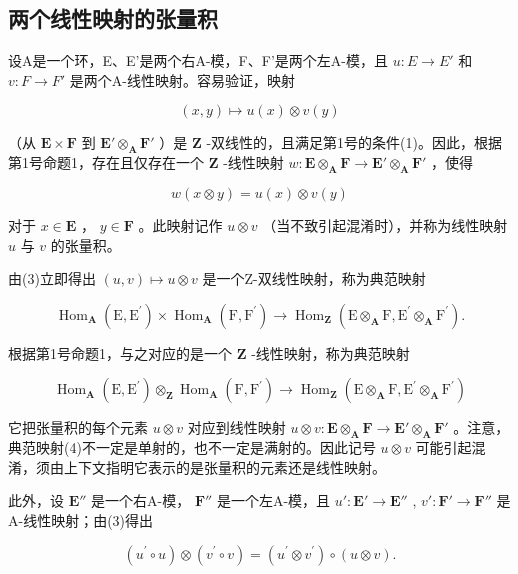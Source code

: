 \subsection{两个线性映射的张量积}

设A是一个环，E、E'是两个右A-模，F、F'是两个左A-模，且 \(u: E \rightarrow E'\) 和 \(v: F \rightarrow F'\) 是两个A-线性映射。容易验证，映射

\[
(x, y) \mapsto u (x) \otimes v (y)
\]

（从 \(\mathbf{E} \times \mathbf{F}\) 到 \(\mathbf{E}' \otimes_{\mathbf{A}} \mathbf{F}'\) ）是 \(\mathbf{Z}\) -双线性的，且满足第1号的条件(1)。因此，根据第1号命题1，存在且仅存在一个 \(\mathbf{Z}\) -线性映射 \(w: \mathbf{E} \otimes_{\mathbf{A}} \mathbf{F} \to \mathbf{E}' \otimes_{\mathbf{A}} \mathbf{F}'\) ，使得

\[
w (x \otimes y) = u (x) \otimes v (y)\tag{3}
\]

对于 \(x \in \mathbf{E}\) ， \(y \in \mathbf{F}\) 。此映射记作 \(u \otimes v\) （当不致引起混淆时），并称为线性映射 \(u\) 与 \(v\) 的张量积。

由(3)立即得出 \((u, v) \mapsto u \otimes v\) 是一个Z-双线性映射，称为典范映射

\[
\operatorname{Hom} _ {\mathbf {A}} (\mathrm{E}, \mathrm{E} ^ {\prime}) \times \operatorname{Hom} _ {\mathbf {A}} (\mathrm{F}, \mathrm{F} ^ {\prime}) \rightarrow \operatorname{Hom} _ {\mathbf {Z}} (\mathrm{E} \otimes_ {\mathbf {A}} \mathrm{F}, \mathrm{E} ^ {\prime} \otimes_ {\mathbf {A}} \mathrm{F} ^ {\prime}).
\]

根据第1号命题1，与之对应的是一个 \(\mathbf{Z}\) -线性映射，称为典范映射

\[
\operatorname{Hom} _ {\mathbf {A}} (\mathrm{E}, \mathrm{E} ^ {\prime}) \otimes_ {\mathbf {Z}} \operatorname{Hom} _ {\mathbf {A}} (\mathrm{F}, \mathrm{F} ^ {\prime}) \rightarrow \operatorname{Hom} _ {\mathbf {Z}} (\mathrm{E} \otimes_ {\mathbf {A}} \mathrm{F}, \mathrm{E} ^ {\prime} \otimes_ {\mathbf {A}} \mathrm{F} ^ {\prime})\tag{4}
\]

它把张量积的每个元素 \(u \otimes v\) 对应到线性映射 \(u \otimes v: \mathbf{E} \otimes_{\mathbf{A}} \mathbf{F} \to \mathbf{E}' \otimes_{\mathbf{A}} \mathbf{F}'\) 。注意，典范映射(4)不一定是单射的，也不一定是满射的。因此记号 \(u \otimes v\) 可能引起混淆，须由上下文指明它表示的是张量积的元素还是线性映射。

此外，设 \(\mathbf{E}''\) 是一个右A-模， \(\mathbf{F}''\) 是一个左A-模，且 \(u':\mathbf{E}'\to\mathbf{E}''\) , \(v':\mathbf{F}'\to\mathbf{F}''\) 是A-线性映射；由(3)得出

\[
\left(u ^ {\prime} \circ u\right) \otimes \left(v ^ {\prime} \circ v\right) = \left(u ^ {\prime} \otimes v ^ {\prime}\right) \circ (u \otimes v).\tag{5}
\]
\relax{}
